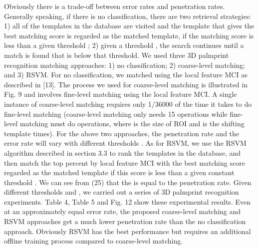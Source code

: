 Obviously there is a trade-off between error rates and penetration rates. Generally speaking, if there is no classification, there are two retrieval strategies: 1) all of the templates in the database are visited and the template that gives the best matching score is regarded as the matched template, if the matching score is less than a given threshold  ; 2) given a threshold  , the search continues until a match is found that is below that threshold.
We used three 3D palmprint recognition matching approaches: 1) no classification; 2) coarse-level matching; and 3) RSVM. For no classification, we matched using the local feature MCI as described in [13]. The process we used for coarse-level matching is illustrated in Fig. 9 and involves fine-level matching using the local feature MCI. A single instance of coarse-level matching requires only 1/36000 of the time it takes to do fine-level matching (coarse-level matching only needs 15 operations while fine-level matching must do   operations, where   is the size of ROI and   is the shifting template times). For the above two approaches, the penetration rate and the error rate will vary with different thresholds  . As for RSVM, we use the RSVM algorithm described in section 3.3 to rank the templates in the database, and then match the top   percent by local feature MCI with the best matching score regarded as the matched template if this score is less than a given constant threshold  . We can see from (25) that the   is equal to the penetration rate. Given different thresholds   and  , we carried out a series of 3D palmprint recognition experiments. Table 4, Table 5 and Fig. 12 show these experimental results. Even at an approximately equal error rate, the proposed coarse-level matching and RSVM approaches get a much lower penetration rate than the no classification approach. Obviously RSVM has the best performance but requires an additional offline training process compared to coarse-level matching.
